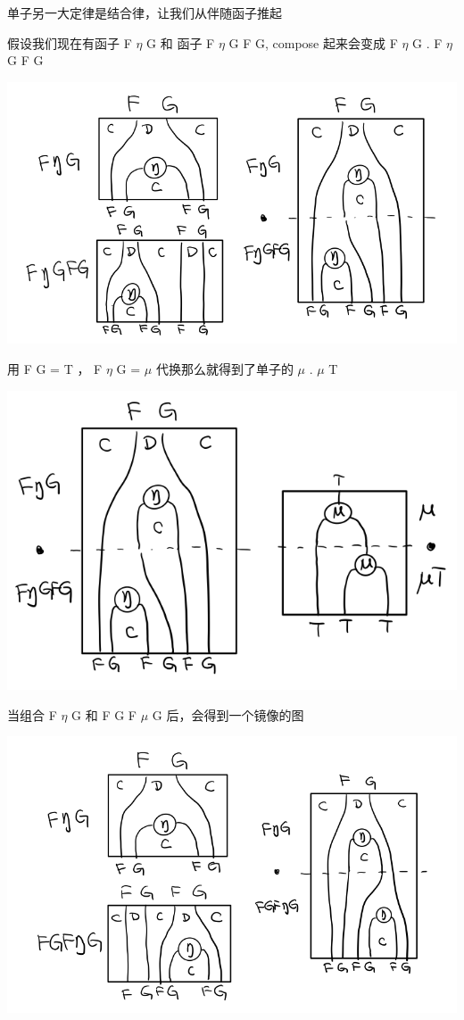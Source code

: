 \documentclass[letterspacing]{tufte-book}
\begin{document}
单子另一大定律是结合律，让我们从伴随函子推起

假设我们现在有函子 F \(\eta\) G 和 函子 F \(\eta\) G F G, compose 起来会变成  F \(\eta\) G . F \(\eta\) G F G
\begin{center}
\includegraphics[width=.9\linewidth]{images/p1-ajunction-functor-monad-laws-1.png}
\end{center}

用 F G = T ， F \(\eta\) G = \(\mu\) 代换那么就得到了单子的 \(\mu\) . \(\mu\) T
\begin{center}
\includegraphics[width=.9\linewidth]{images/p1-ajunction-functor-monad-laws-2.png}
\end{center}

当组合 F \(\eta\) G 和 F G F \(\mu\) G 后，会得到一个镜像的图
\begin{center}
\includegraphics[width=.9\linewidth]{images/p1-ajunction-functor-monad-laws-3.png}
\end{center}
\end{document}
